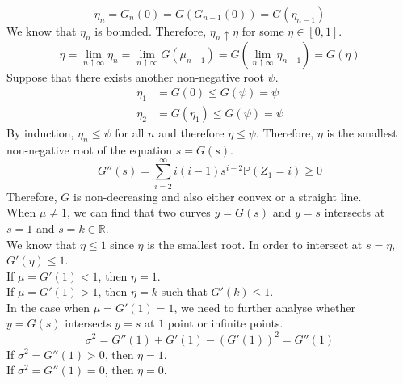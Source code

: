 \documentclass{huhtakm-template-book}
\newcommand{\prob}{\mathbb{P}}
\begin{document}
\begin{proofing}
    \begin{equation*}
        \eta_{n}=G_{n}(0)=G(G_{n-1}(0))=G(\eta_{n-1})
    \end{equation*}
    We know that $\eta_{n}$ is bounded. Therefore, $\eta_{n}\uparrow\eta$ for some $\eta\in[0,1]$.
    \begin{equation*}
        \eta=\lim_{n\uparrow\infty}\eta_{n}=\lim_{n\uparrow\infty}G(\mu_{n-1})=G\left(\lim_{n\uparrow\infty}\eta_{n-1}\right)=G(\eta)
    \end{equation*}
    Suppose that there exists another non-negative root $\psi$.
    \begin{align*}
        \eta_{1}&=G(0)\leq G(\psi)=\psi\\
        \eta_{2}&=G(\eta_{1})\leq G(\psi)=\psi
    \end{align*}
    By induction, $\eta_{n}\leq\psi$ for all $n$ and therefore $\eta\leq\psi$. Therefore, $\eta$ is the smallest non-negative root of the equation $s=G(s)$.
    \begin{equation*}
        G''(s)=\sum_{i=2}^{\infty}i(i-1)s^{i-2}\prob(Z_{1}=i)\geq 0
    \end{equation*}
    Therefore, $G$ is non-decreasing and also either convex or a straight line.\\
    When $\mu\neq 1$, we can find that two curves $y=G(s)$ and $y=s$ intersects at $s=1$ and $s=k\in\mathbb{R}$.\\
    We know that $\eta\leq 1$ since $\eta$ is the smallest root. In order to intersect at $s=\eta$, $G'(\eta)\leq 1$.\\
    If $\mu=G'(1)<1$, then $\eta=1$.\\
    If $\mu=G'(1)>1$, then $\eta=k$ such that $G'(k)\leq 1$.\\
    In the case when $\mu=G'(1)=1$, we need to further analyse whether $y=G(s)$ intersects $y=s$ at $1$ point or infinite points.
    \begin{equation*}
        \sigma^{2}=G''(1)+G'(1)-(G'(1))^{2}=G''(1)
    \end{equation*}
    If $\sigma^{2}=G''(1)>0$, then $\eta=1$.\\
    If $\sigma^{2}=G''(1)=0$, then $\eta=0$.
\end{proofing}
\end{document}
